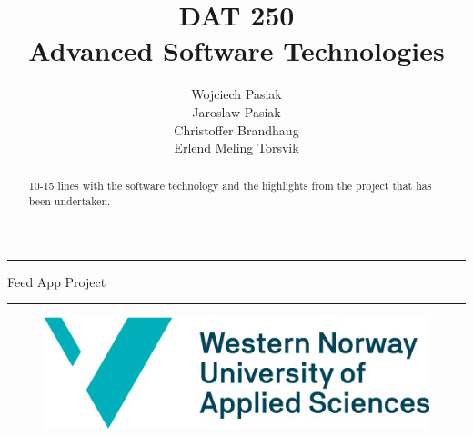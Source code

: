 \documentclass[11pt]{article}
\begin{document}
\title{DAT 250\\Advanced Software Technologies}

\author{Wojciech Pasiak\\Jaroslaw Pasiak\\Christoffer Brandhaug\\Erlend Meling Torsvik}

\maketitle

\rule{\textwidth}{1.6pt}\vspace*{\baselineskip}\vspace{2pt}
\vspace{0.75\baselineskip}
{\huge \centering
Feed App Project\\}
\vspace{0.75\baselineskip}
\rule{\textwidth}{1.6pt}\vspace*{-\baselineskip}\vspace{2pt}
\vspace{9pc}
\begin{figure}[H]
  \centering
  \includegraphics[scale=0.5]{figs/HVL_logo.jpg}
  \label{fig:logo}
\end{figure}
\newpage
\tableofcontents
\newpage

\begin{abstract}

  10-15 lines with the software technology and the highlights from the
  project that has been undertaken.

\end{abstract}

%















\end{document}

